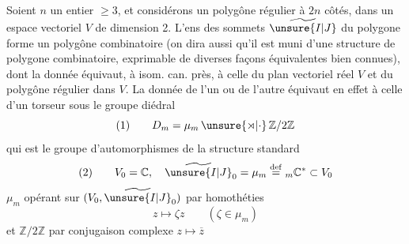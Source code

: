 Soient $n$ un entier $\ge3$, et considérons un
polygône régulier à  $2n$ côtés, dans un
espace vectoriel  $V$ de dimension 2.
L'ens des sommets $\widetilde{\unsure{I|J}}$ du polygone forme
un
polygône combinatoire (on dira aussi qu'il est muni d'une structure de polygone
combinatoire, exprimable de diverses façons équivalentes bien connues), dont
la donnée équivaut, à isom. can. près, à celle du plan vectoriel réel $V$
et du polygône régulier dans $V$. La donnée de l'un ou de l'autre
équivaut en effet à celle d'un torseur sous le groupe diédral
\[
(1)\qquad D_m=\mu_m\,\unsure{\rtimes|\cdot}\,\mathbb Z/2\mathbb Z
\]
qui est le groupe d'automorphismes de la structure standard
\[
(2)\qquad V_0=\mathbb C,\quad
\widetilde{\unsure{I|J}}_0=\mu_m\overset{\mathrm{def}}={}_m\mathbb C^*\subset V_0
\]
$\mu_m$ opérant sur $(V_0,\widetilde{\unsure{I|J}}_0)$ par homothéties
\[
z\longmapsto\zeta z\qquad(\zeta\in\mu_m)
\]
et $\mathbb Z/2\mathbb Z$ par conjugaison complexe
$z\longmapsto\overline z$

